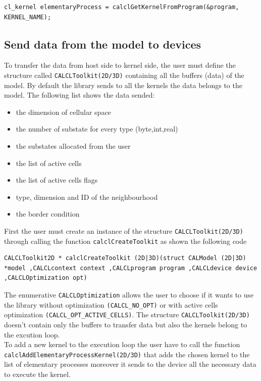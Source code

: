 \begin{lstlisting}
cl_kernel elementaryProcess = calclGetKernelFromProgram(&program,
KERNEL_NAME);
\end{lstlisting}


\subsection{Send data from the model to devices}

To transfer the data from host side to kernel side, the user must
define the structure called \verb'CALCLToolkit(2D/3D)' containing all
the buffers (data) of the model.  By default the library sends to all
the kernels the data belongs to the model. The following list shows
the data sended:
\begin{itemize}
	\item the dimension of cellular space
	\item the number of substate for every type (byte,int,real)
	\item the substates allocated from the user
	\item the list of active cells
	\item the list of active cells flags
	\item type, dimension and ID of the neighbourhood
	\item the border condition
\end{itemize}


 First the user must create an instance of the structure
 \verb'CALCLToolkit(2D/3D)' through calling the function
 \verb'calclCreateToolkit' as shown the following code
\begin{lstlisting}
CALCLToolkit2D * calclCreateToolkit (2D|3D)(struct CALModel (2D|3D)
*model ,CALCLcontext context ,CALCLprogram program ,CALCLdevice device
,CALCLOptimization opt)
\end{lstlisting}
The enumerative \verb'CALCLOptimization' allows the user to choose if
it wants to use the library without optimization \verb|(CALCL_NO_OPT)|
or with active cells optimization \verb|(CALCL_OPT_ACTIVE_CELLS)|. The
structure \verb'CALCLToolkit(2D/3D)' doesn't contain only the buffers
to transfer data but also the kernels belong to the excution
loop. \\ To add a new kernel to the execution loop the user have to
call the function \verb'calclAddElementaryProcessKernel(2D/3D)' that
adds the chosen kernel to the list of elementary processes moreover it
sends to the device all the necessary data to execute the kernel.

